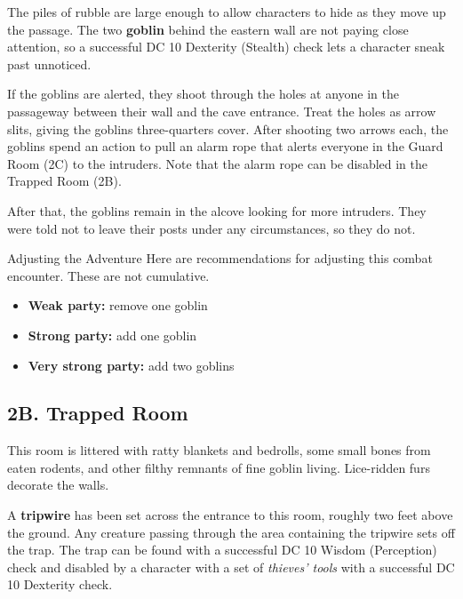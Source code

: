 \documentclass[10pt,a4paper,twoside,bg=print,twocolumn,openany,nodeprecatedcode]{dndbook}
\begin{document}
The piles of rubble are large enough to allow characters to hide as they move up the passage. The two \textbf{goblin} behind the eastern wall are not paying close attention, so a successful DC 10 Dexterity (Stealth) check lets a character sneak past unnoticed.

If the goblins are alerted, they shoot through the holes at anyone in the passageway between their wall and the cave entrance. Treat the holes as arrow slits, giving the goblins three-quarters cover. After shooting two arrows each, the goblins spend an action to pull an alarm rope that alerts everyone in the Guard Room (2C) to the intruders. Note that the alarm rope can be disabled in the Trapped Room (2B).

After that, the goblins remain in the alcove looking for more intruders. They were told not to leave their posts under any circumstances, so they do not.

\begin{DndSidebar}[float=!b]{Adjusting the Adventure}
Here are recommendations for adjusting this combat encounter. These are not cumulative.




\begin{itemize}
\item \textbf{Weak party:} remove one goblin
\item \textbf{Strong party:} add one goblin
\item \textbf{Very strong party:} add two goblins
\end{itemize}



\end{DndSidebar}

\subsection{2B. Trapped Room}
\begin{DndReadAloud}{}
This room is littered with ratty blankets and bedrolls, some small bones from eaten rodents, and other filthy remnants of fine goblin living. Lice-ridden furs decorate the walls.

\end{DndReadAloud}

A \textbf{tripwire} has been set across the entrance to this room, roughly two feet above the ground. Any creature passing through the area containing the tripwire sets off the trap. The trap can be found with a successful DC 10 Wisdom (Perception) check and disabled by a character with a set of \textit{thieves' tools} with a successful DC 10 Dexterity check.
\end{document}
